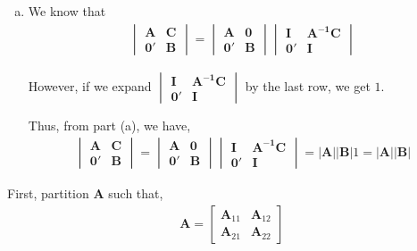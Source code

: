 \documentclass[12pt]{article}\usepackage[]{graphicx}\usepackage[]{color}
\newenvironment{problem}[2][Problem]{\begin{trivlist}
\item[\hskip \labelsep {\bfseries #1}\hskip \labelsep {\bfseries #2.}]}{\end{trivlist}}
\newcommand{\vct}{\mathbf}
\begin{document}
\begin{enumerate}[a)]
\item We know that
\begin{align*}
\begin{vmatrix}
\vct{A} & \vct{C}\\
\vct{0'} & \vct{B}
\end{vmatrix}
= \begin{vmatrix}
\vct{A} & \vct{0}\\
\vct{0'} & \vct{B}
\end{vmatrix}
\begin{vmatrix}
\vct{I} & \vct{\vct{A}^{-1}\vct{C}}\\
\vct{0'} & \vct{I}
\end{vmatrix}
\end{align*}

However, if we expand $\begin{vmatrix}
\vct{I} & \vct{\vct{A}^{-1}\vct{C}}\\
\vct{0'} & \vct{I}
\end{vmatrix}$ by the last row, we get $1$. 

Thus, from part (a), we have,
\begin{align*}
\begin{vmatrix}
\vct{A} & \vct{C}\\
\vct{0'} & \vct{B}
\end{vmatrix}
= \begin{vmatrix}
\vct{A} & \vct{0}\\
\vct{0'} & \vct{B}
\end{vmatrix}
\begin{vmatrix}
\vct{I} & \vct{\vct{A}^{-1}\vct{C}}\\
\vct{0'} & \vct{I}
\end{vmatrix} = |\vct{A}||\vct{B}|1 = |\vct{A}||\vct{B}|
\end{align*}

\end{enumerate}


\begin{problem}{4.11}
\end{problem}

First, partition $\vct{A}$ such that,
\begin{align*}
\vct{A} = \begin{bmatrix} \vct{A}_{11} & \vct{A}_{12} \\ \vct{A}_{21} & \vct{A}_{22} \end{bmatrix}
\end{align*}
\end{document}
